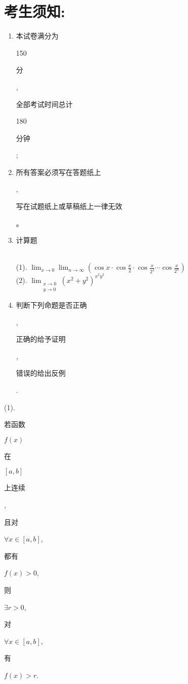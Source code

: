 \documentclass[10pt]{article}
\begin{document}
\section{考生须知:}
\begin{enumerate}
  \item \begin{CJK}{UTF8}{mj}本试卷满分为\end{CJK} 150 \begin{CJK}{UTF8}{mj}分\end{CJK}, \begin{CJK}{UTF8}{mj}全部考试时间总计\end{CJK} 180 \begin{CJK}{UTF8}{mj}分钟\end{CJK};

  \item \begin{CJK}{UTF8}{mj}所有答案必须写在答题纸上\end{CJK}, \begin{CJK}{UTF8}{mj}写在试题纸上或草稿纸上一律无效\end{CJK}。

  \item \begin{CJK}{UTF8}{mj}计算题\end{CJK}\\
(1). $\lim _{x \rightarrow 0} \lim _{n \rightarrow \infty}\left(\cos x \cdot \cos \frac{x}{2} \cdot \cos \frac{x}{2^{2}} \cdots \cos \frac{x}{2^{n}}\right)$\\
(2). $\lim _{\substack{x \rightarrow 0 \\ y \rightarrow 0}}\left(x^{2}+y^{2}\right)^{x^{2} y^{2}}$

  \item \begin{CJK}{UTF8}{mj}判断下列命题是否正确\end{CJK}, \begin{CJK}{UTF8}{mj}正确的给予证明\end{CJK}, \begin{CJK}{UTF8}{mj}错误的给出反例\end{CJK}.

\end{enumerate}
(1). \begin{CJK}{UTF8}{mj}若函数\end{CJK} $f(x)$ \begin{CJK}{UTF8}{mj}在\end{CJK} $[a, b]$ \begin{CJK}{UTF8}{mj}上连续\end{CJK}, \begin{CJK}{UTF8}{mj}且对\end{CJK} $\forall x \in[a, b]$, \begin{CJK}{UTF8}{mj}都有\end{CJK} $f(x)>0$, \begin{CJK}{UTF8}{mj}则\end{CJK} $\exists r>0$, \begin{CJK}{UTF8}{mj}对\end{CJK} $\forall x \in[a, b]$, \begin{CJK}{UTF8}{mj}有\end{CJK} $f(x)>r$.
\end{document}
